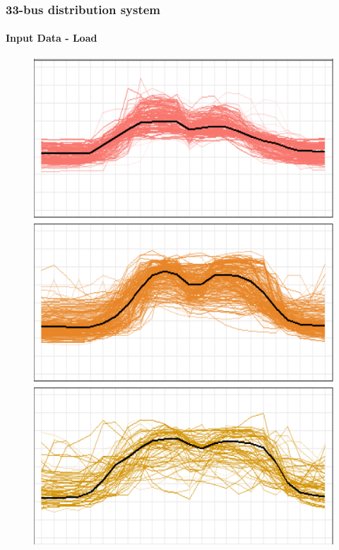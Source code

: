 \documentclass[
	11pt, %
	aspectratio=169, %
]{beamer}
\begin{document}
\begin{frame}
	\frametitle{33-bus distribution system}
	\framesubtitle{Input Data - Load}

	\begin{figure}
		\centering
		\begin{minipage}{0.16\textwidth}
			\includegraphics[width=\linewidth,keepaspectratio]{load_profile_1.png}
		\end{minipage}
		\begin{minipage}{0.16\textwidth}

\end{minipage}
\end{figure}
\end{frame}
\end{document}
